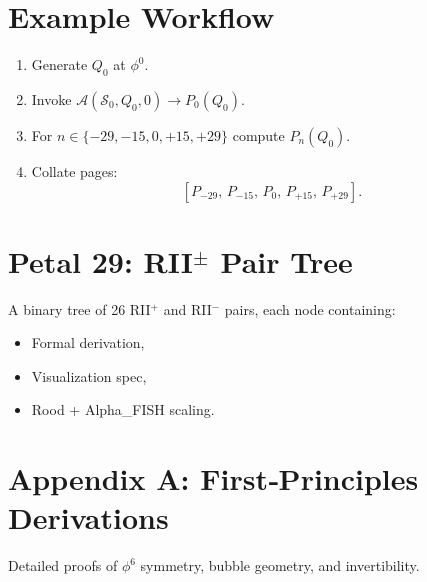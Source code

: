 \documentclass[12pt]{article}
\theoremstyle{definition}
\begin{document}
\section{Example Workflow}

\begin{enumerate}
  \item Generate $Q_0$ at $\phi^0$.
  \item Invoke $\mathcal{A}(\mathcal{S}_0,Q_0,0)\to P_0(Q_0)$.
  \item For $n\in\{-29,-15,0,+15,+29\}$ compute $P_n(Q_0)$.
  \item Collate pages:
    \[
      [P_{-29},\,P_{-15},\,P_0,\,P_{+15},\,P_{+29}].
    \]
\end{enumerate}

\section{Petal 29: RII$^\pm$ Pair Tree}

A binary tree of 26 RII$^+$ and RII$^-$ pairs, each node containing:
\begin{itemize}
  \item Formal derivation,
  \item Visualization spec,
  \item Rood + Alpha\_FISH scaling.
\end{itemize}

\appendix
\section{Appendix A: First‑Principles Derivations}
Detailed proofs of $\phi^6$ symmetry, bubble geometry, and invertibility.
\end{document}
